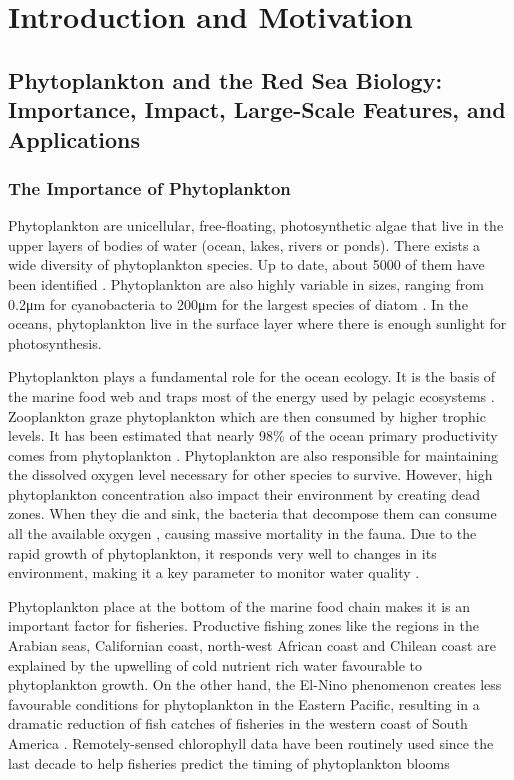\chapter{Introduction and Motivation}

\section{Phytoplankton and the Red Sea Biology: Importance, Impact, Large-Scale
Features, and Applications}

\subsection{The Importance of Phytoplankton}

Phytoplankton are unicellular, free-floating, photosynthetic algae that live in the upper layers of bodies of water (ocean, lakes, rivers or ponds). There exists a wide diversity of phytoplankton species. Up to date, about 5000 of them have been identified \cite{Tett1995}. Phytoplankton are also highly variable in sizes, ranging from 0.2μm for cyanobacteria to 200μm for the largest species of diatom \cite{Pal2014}. In the oceans, phytoplankton live in the surface layer where there is enough sunlight for photosynthesis. 

Phytoplankton plays a fundamental role for the ocean ecology. It is the basis of the marine food web and traps most of the energy used by pelagic ecosystems \cite{Pal2014}. Zooplankton graze phytoplankton which are then consumed by higher trophic levels. It has been estimated that nearly 98\% of the ocean primary productivity comes from phytoplankton \cite{Pal2014}. Phytoplankton are also responsible for maintaining the dissolved oxygen level necessary for other species to survive. However, high phytoplankton concentration also impact their environment by creating dead zones. When they die and sink, the bacteria that decompose them can consume all the available oxygen \cite{Pal2014}, causing massive mortality in the fauna. Due to the rapid growth of phytoplankton, it responds very well to changes in its environment, making it a key parameter to monitor water quality \cite{Wu2014}.

Phytoplankton place at the bottom of the marine food chain makes it is an important factor for fisheries. Productive fishing zones like the regions in the Arabian seas, Californian coast, north-west African coast and Chilean coast are explained by the upwelling of cold nutrient rich water favourable to phytoplankton growth. On the other hand, the El-Nino phenomenon creates less favourable conditions for phytoplankton in the Eastern Pacific, resulting in a dramatic reduction of fish catches of fisheries in the western coast of South America \cite{Robinson2010}. Remotely-sensed chlorophyll data have been routinely used since the last decade to help fisheries predict the timing of phytoplankton blooms \cite{Robinson2010}

